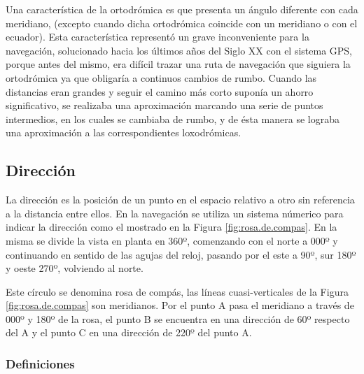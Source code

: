 Una característica de la ortodrómica es que presenta un ángulo diferente con cada meridiano, (excepto cuando dicha ortodrómica coincide con un meridiano o con el ecuador). Esta característica representó un grave inconveniente para la navegación, solucionado hacia los últimos años del Siglo XX con el sistema GPS, porque antes del mismo, era difícil trazar una ruta de navegación que siguiera la ortodrómica ya que obligaría a continuos cambios de rumbo. Cuando las distancias eran grandes y seguir el camino más corto suponía un ahorro significativo, se realizaba una aproximación marcando una serie de puntos intermedios, en los cuales se cambiaba de rumbo, y de ésta manera se lograba una aproximación a las correspondientes loxodrómicas.

\subsection{Direcci\'on}
\label{sec:direccion}

La direcci\'on es la posici\'on de un punto en el espacio relativo a otro sin referencia a la distancia entre ellos. En la navegaci\'on se utiliza un sistema n\'umerico para indicar la direcci\'on como el mostrado en la Figura \ref{fig:rosa.de.compas}. En la misma se divide la vista en planta en 360º, comenzando con el norte a 000º y continuando en sentido de las agujas del reloj, pasando por el este a 90º, sur 180º y oeste 270º, volviendo al norte.

Este c\'irculo se denomina rosa de comp\'as, las l\'ineas cuasi-verticales de la Figura \ref{fig:rosa.de.compas} son meridianos. Por el punto A pasa el meridiano a trav\'es de 000º y 180º de la rosa, el punto B se encuentra en una direcci\'on de 60º respecto del A y el punto C en una direcci\'on de 220º del punto A.

\subsubsection{Definiciones}
\label{sec:definiciones.navegacion}

